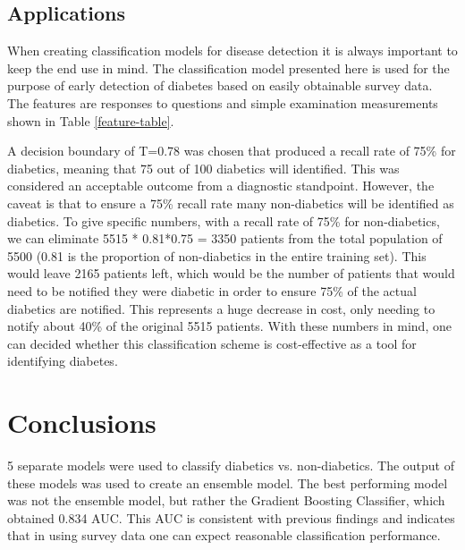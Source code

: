 \documentclass{article} %
\begin{document}
\subsection{Applications} 
When creating classification models for disease detection it is always important to keep the end use in mind. The classification model presented here is used for the purpose of early detection of diabetes based on easily obtainable survey data. The features are responses to questions and simple examination measurements shown in Table \ref{feature-table}. 

A decision boundary of T=0.78 was chosen that produced a recall rate of 75\% for diabetics, meaning that 75 out of 100 diabetics will identified. This was considered an acceptable outcome from a diagnostic standpoint. However, the caveat is that to ensure a 75\% recall rate many non-diabetics will be identified as diabetics. To give specific numbers, with a recall rate of 75\% for non-diabetics, we can eliminate 5515 * 0.81*0.75 = 3350 patients from the total population of 5500 (0.81 is the proportion of non-diabetics in the entire training set).  This would leave 2165 patients left, which would be the number of patients that would need to be notified they were diabetic in order to ensure 75\% of the actual diabetics are notified. This represents a huge decrease in cost, only needing to notify about 40\% of the original 5515 patients. With these numbers in mind, one can decided whether this classification scheme is cost-effective as a tool for identifying diabetes.
  
\section{Conclusions}
5 separate models were used to classify diabetics vs. non-diabetics. The output of these models was used to create an ensemble model. The best performing model was not the ensemble model, but rather the Gradient Boosting Classifier, which obtained 0.834 AUC. This AUC is consistent with previous findings and indicates that in using survey data one can expect reasonable classification performance. 



\end{document}

